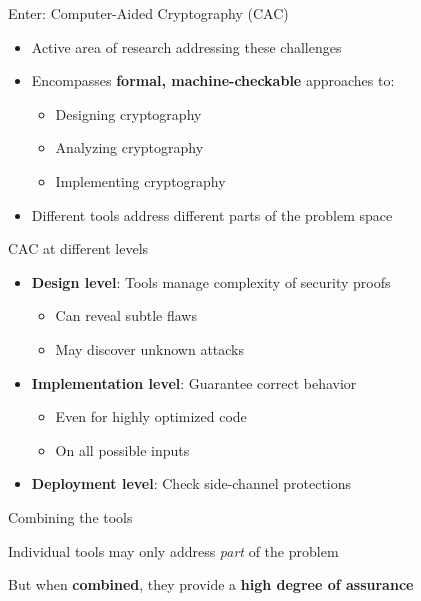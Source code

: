 \documentclass[aspectratio=169, lualatex, handout]{beamer}
\begin{document}
\begin{frame}{Enter: Computer-Aided Cryptography (CAC)}
	\begin{itemize}
		\item Active area of research addressing these challenges
		\item Encompasses \textbf{formal, machine-checkable} approaches to:
		      \begin{itemize}
			      \item Designing cryptography
			      \item Analyzing cryptography
			      \item Implementing cryptography
		      \end{itemize}
		\item Different tools address different parts of the problem space
	\end{itemize}
\end{frame}

\begin{frame}{CAC at different levels}
	\begin{itemize}
		\item \textbf{Design level}: Tools manage complexity of security proofs
		      \begin{itemize}
			      \item Can reveal subtle flaws
			      \item May discover unknown attacks
		      \end{itemize}
		\item \textbf{Implementation level}: Guarantee correct behavior
		      \begin{itemize}
			      \item Even for highly optimized code
			      \item On all possible inputs
		      \end{itemize}
		\item \textbf{Deployment level}: Check side-channel protections
	\end{itemize}
\end{frame}

\begin{frame}{Combining the tools}
	\begin{center}
		\Large
		Individual tools may only address \textit{part} of the problem

		\vspace{1em}

		But when \textbf{combined}, they provide a \textbf{high degree of assurance}
	\end{center}
\end{frame}
\end{document}
